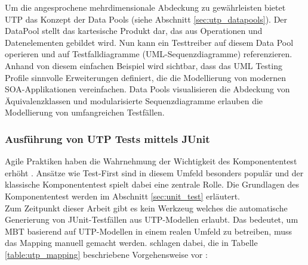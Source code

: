 Um die angesprochene mehrdimensionale Abdeckung zu gewährleisten bietet \Gls{UTP} das Konzept der Data Pools (siehe Abschnitt \ref{sec:utp_datapools}). Der DataPool stellt das kartesische Produkt dar, das aus Operationen und Datenelementen gebildet wird. Nun kann ein Testtreiber auf diesem Data Pool operieren und auf Testfalldiagramme (UML-Sequenzdiagramme) referenzieren.\\
Anhand von diesem einfachen Beispiel wird sichtbar, dass das \Gls{UML} Testing Profile sinnvolle Erweiterungen definiert, die die Modellierung von modernen SOA-Applikationen vereinfachen. Data Pools visualisieren die Abdeckung von Äquivalenzklassen und modularisierte Sequenzdiagramme erlauben die Modellierung von umfangreichen Testfällen. 

\subsubsection{Ausführung von UTP Tests mittels JUnit}
Agile Praktiken haben die Wahrnehmung der Wichtigkeit des Komponententest erhöht \cite{_model-driven_2007}. Ansätze wie \gls{Test-First} sind in diesem Umfeld besonders populär und der klassische Komponententest spielt dabei eine zentrale Rolle. Die Grundlagen des Komponententest werden im Abschnitt \ref{sec:unit_test} erläutert.\\

Zum Zeitpunkt dieser Arbeit gibt es kein Werkzeug welches die automatische Generierung von JUnit-Testfällen aus UTP-Modellen erlaubt. Das bedeutet, um \Gls{MBT} basierend auf UTP-Modellen in einem realen Umfeld zu betreiben, muss das Mapping manuell gemacht werden. \citeauthor{_model-driven_2007} schlagen dabei, die in Tabelle \ref{table:utp_mapping} beschriebene Vorgehensweise vor \cite{_model-driven_2007}:


